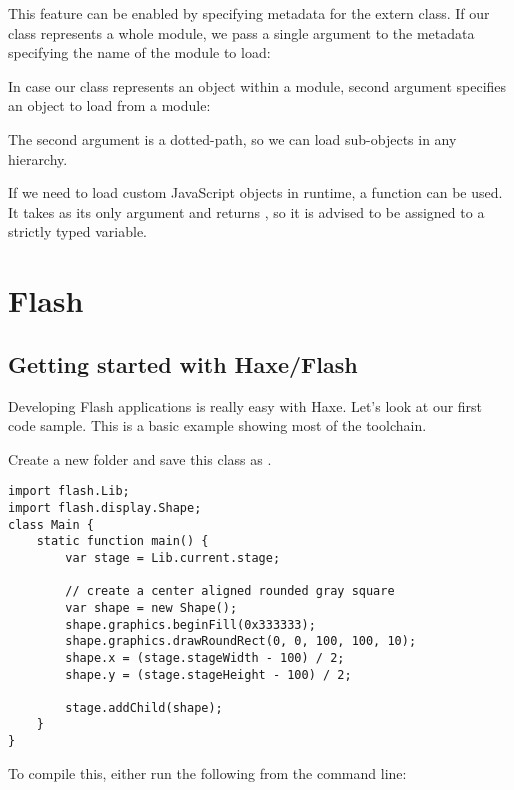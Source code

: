 This feature can be enabled by specifying  metadata for the extern class. If our  class represents a whole module, we pass a single argument to the  metadata specifying the name of the module to load:


In case our  class represents an object within a module, second  argument specifies an object to load from a module:


The second argument is a dotted-path, so we can load sub-objects in any hierarchy.

If we need to load custom JavaScript objects in runtime, a  function can be used. It takes  as its only argument and returns , so it is advised to be assigned to a strictly typed variable.

\section{Flash}
\label{target-flash}

\subsection{Getting started with Haxe/Flash}
\label{target-flash-getting-started}

Developing Flash applications is really easy with Haxe. Let's look at our first code sample.
This is a basic example showing most of the toolchain. 

Create a new folder and save this class as .

\begin{lstlisting}
import flash.Lib;
import flash.display.Shape;
class Main {
    static function main() {
        var stage = Lib.current.stage;
        
        // create a center aligned rounded gray square
        var shape = new Shape();
        shape.graphics.beginFill(0x333333);
		shape.graphics.drawRoundRect(0, 0, 100, 100, 10);
		shape.x = (stage.stageWidth - 100) / 2;
		shape.y = (stage.stageHeight - 100) / 2;
		
		stage.addChild(shape);
    }    
}
\end{lstlisting}

To compile this, either run the following from the command line:

